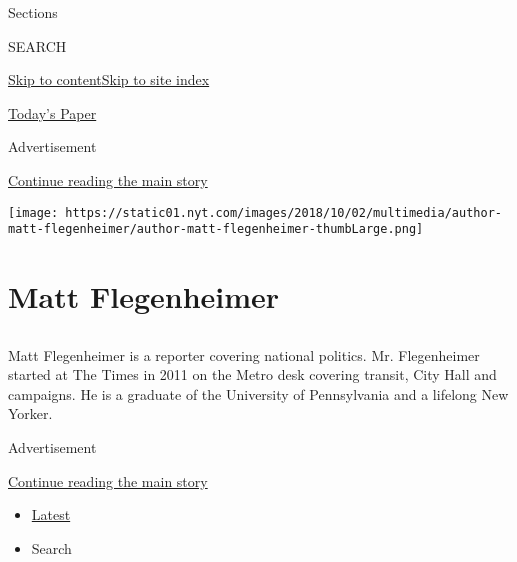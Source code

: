 Sections

SEARCH

\protect\hyperlink{site-content}{Skip to
content}\protect\hyperlink{site-index}{Skip to site index}

\href{https://myaccount.nytimes.com/auth/login?response_type=cookie\&client_id=vi}{}

\href{https://www.nytimes.com/section/todayspaper}{Today's Paper}

Advertisement

\protect\hyperlink{after-top}{Continue reading the main story}

\texttt{[image: https://static01.nyt.com/images/2018/10/02/multimedia/author-matt-flegenheimer/author-matt-flegenheimer-thumbLarge.png]}

\hypertarget{matt-flegenheimer}{%
\section{Matt Flegenheimer}\label{matt-flegenheimer}}

\subsection{}

Matt Flegenheimer is a reporter covering national politics. Mr.
Flegenheimer started at The Times in 2011 on the Metro desk covering
transit, City Hall and campaigns. He is a graduate of the University of
Pennsylvania and a lifelong New Yorker.

Advertisement

\protect\hyperlink{after-mid1}{Continue reading the main story}

\begin{itemize}
\tightlist
\item
  \protect\hyperlink{stream-panel}{Latest}
\item
  Search
\end{itemize}

